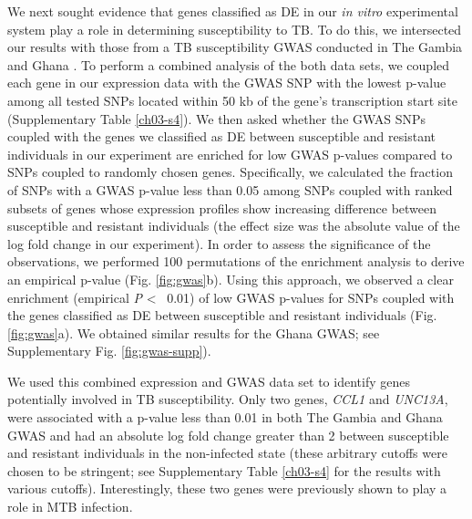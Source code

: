 We next sought evidence that genes classified as DE in our \emph{in
  vitro} experimental system play a role in determining susceptibility
to TB. To do this, we intersected our results with those from a TB
susceptibility GWAS conducted in The Gambia and Ghana
\citep{Thye2010}.  To perform a combined analysis of the both data
sets, we coupled each gene in our expression data with the GWAS SNP
with the lowest p-value among all tested SNPs located within 50 kb of
the gene's transcription start site (Supplementary Table
\ref{ch03-s4}). We then asked whether the GWAS SNPs coupled with the
genes we classified as DE between susceptible and resistant
individuals in our experiment are enriched for low GWAS p-values
compared to SNPs coupled to randomly chosen genes.  Specifically, we
calculated the fraction of SNPs with a GWAS p-value less than 0.05
among SNPs coupled with ranked subsets of genes whose expression
profiles show increasing difference between susceptible and resistant
individuals (the effect size was the absolute value of the log fold
change in our experiment). In order to assess the significance of the
observations, we performed 100 permutations of the enrichment analysis
to derive an empirical p-value (Fig.  \ref{fig:gwas}b). Using this
approach, we observed a clear enrichment (empirical \emph{P} \textless
\, 0.01) of low GWAS p-values for SNPs coupled with the genes
classified as DE between susceptible and resistant individuals
(Fig. \ref{fig:gwas}a). We obtained similar results for the Ghana
GWAS; see Supplementary Fig.  \ref{fig:gwas-supp}).

We used this combined expression and GWAS data set to identify genes
potentially involved in TB susceptibility. Only two genes, \emph{CCL1}
and \emph{UNC13A}, were associated with a p-value less than 0.01 in
both The Gambia and Ghana GWAS and had an absolute log fold change
greater than 2 between susceptible and resistant individuals in the
non-infected state (these arbitrary cutoffs were chosen to be
stringent; see Supplementary Table \ref{ch03-s4} for the results with
various cutoffs). Interestingly, these two genes were previously shown
to play a role in MTB infection.

